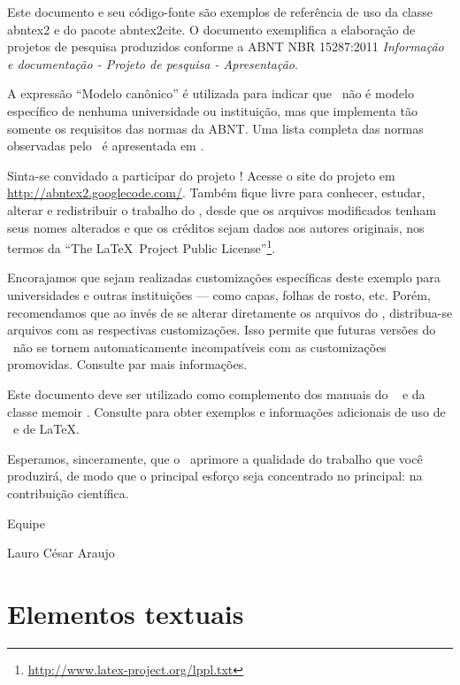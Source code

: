\documentclass[
	12pt,				%
	openright,			%
	twoside,			%
	a4paper,			%
	english,			%
	french,				%
	spanish,			%
	brazil,				%
	]{abntex2}
\begin{document}
Este documento e seu código-fonte são exemplos de referência de uso da classe
\textsf{abntex2} e do pacote \textsf{abntex2cite}. O documento 
exemplifica a elaboração de projetos de pesquisa produzidos
conforme a ABNT NBR 15287:2011 \emph{Informação e documentação - Projeto de
pesquisa - Apresentação}. 

A expressão ``Modelo canônico'' é utilizada para indicar que \abnTeX\ não é
modelo específico de nenhuma universidade ou instituição, mas que implementa tão
somente os requisitos das normas da ABNT. Uma lista completa das normas
observadas pelo \abnTeX\ é apresentada em .

Sinta-se convidado a participar do projeto \abnTeX! Acesse o site do projeto em
\url{http://abntex2.googlecode.com/}. Também fique livre para conhecer,
estudar, alterar e redistribuir o trabalho do \abnTeX, desde que os arquivos
modificados tenham seus nomes alterados e que os créditos sejam dados aos
autores originais, nos termos da ``The \LaTeX\ Project Public
License''\footnote{\url{http://www.latex-project.org/lppl.txt}}.

Encorajamos que sejam realizadas customizações específicas deste exemplo para
universidades e outras instituições --- como capas, folhas de rosto, etc.
Porém, recomendamos que ao invés de se alterar diretamente os arquivos do
\abnTeX, distribua-se arquivos com as respectivas customizações.
Isso permite que futuras versões do \abnTeX~não se tornem automaticamente
incompatíveis com as customizações promovidas. Consulte
 par mais informações.

Este documento deve ser utilizado como complemento dos manuais do \abnTeX\ 
\cite{abntex2classe,abntex2cite,abntex2cite-alf} e da classe \textsf{memoir}
\cite{memoir}. Consulte \citeonline{abntex2modelo} para obter
exemplos e informações adicionais de uso de \abnTeX\ e de \LaTeX.

Esperamos, sinceramente, que o \abnTeX\ aprimore a qualidade do trabalho que
você produzirá, de modo que o principal esforço seja concentrado no principal:
na contribuição científica.

Equipe \abnTeX 

Lauro César Araujo

\chapter{Elementos textuais}
\end{document}
